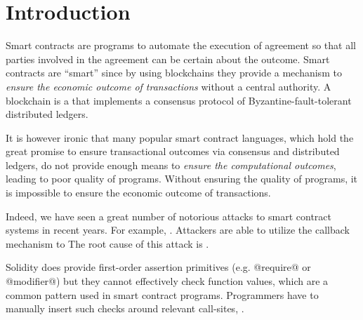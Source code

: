 \documentclass[acmsmall,review,anonymous]{acmart}\settopmatter{printfolios=true,printccs=false,printacmref=false}
\begin{document}
\section{Introduction}




Smart contracts are programs to automate the execution of agreement so that all
parties involved in the agreement can be certain about the outcome.
Smart contracts are ``smart'' since by using blockchains they provide a
mechanism to \emph{ensure the economic outcome of transactions} without a
central authority.
A blockchain is a  that implements a consensus protocol of
Byzantine-fault-tolerant distributed ledgers.

It is however ironic that many popular smart contract languages, which hold the
great promise to ensure transactional outcomes via consensus and distributed
ledgers, do not provide enough means to \emph{ensure the computational outcomes},
leading to poor quality of programs.
Without ensuring the quality of programs, it is impossible to ensure
the economic outcome of transactions.

Indeed, we have seen a great number of notorious attacks to smart contract
systems in recent years.
For example, .
Attackers are able to utilize
the callback mechanism to 
The root cause of this attack is .

Solidity does provide first-order assertion primitives (e.g. @require@ or
@modifier@) but they cannot effectively check function values, which are a
common pattern used in smart contract programs. Programmers have to
manually insert such checks around relevant call-sites, .
\end{document}
